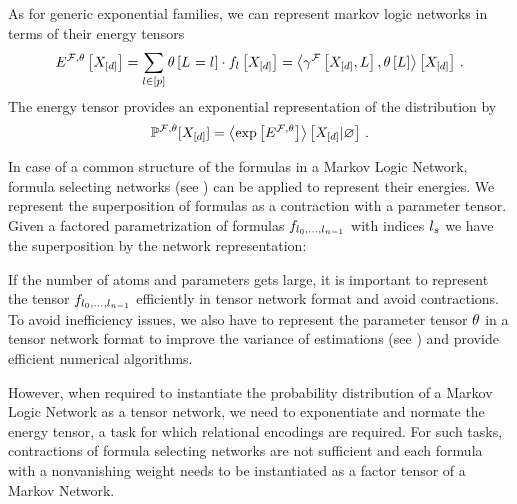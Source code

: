 As for generic exponential families, we can represent markov logic networks in terms of their energy tensors
\begin{align}
	E^{\mathcal{F},\theta}\left[X_{[d]}\right]
	= \sum_{l\in[p]} \theta\left[L_{}=l_{}\right] \cdot f_{l}\left[X_{[d]}\right] 
	= \left\langle \gamma^{\mathcal{F}}\left[X_{[d]},L\right],\theta\left[L\right]\right\rangle \left[ X_{[d]} \right] \, .
\end{align}
The energy tensor provides an exponential representation of the distribution by
\begin{align}
	\mathbb{P}^{\mathcal{F},\theta}[X_{[d]}] = \left\langle \mathrm{exp}\left[E^{\mathcal{F},\theta}\right]\right\rangle \left[ X_{[d]} | \varnothing \right] \, . 
\end{align}

In case of a common structure of the formulas in a Markov Logic Network, formula selecting networks (see ) can be applied to represent their energies.
We represent the superposition of formulas as a contraction with a parameter tensor.
Given a factored parametrization of formulas $f_{l_{0},\ldots,l_{n-1}}$ with indices $l_{s}$ we have the superposition by the network representation:
\begin{center}
	
\end{center}


If the number of atoms and parameters gets large, it is important to represent the tensor ${f_{l_{0},\ldots,l_{n-1}}}$ efficiently in tensor network format and avoid contractions.
To avoid inefficiency issues, we also have to represent the parameter tensor $\theta$ in a tensor network format to improve the variance of estimations (see ) and provide efficient numerical algorithms.

However, when required to instantiate the probability distribution of a Markov Logic Network as a tensor network, we need to exponentiate and normate the energy tensor, a task for which relational encodings are required.
For such tasks, contractions of formula selecting networks are not sufficient and each formula with a nonvanishing weight needs to be instantiated as a factor tensor of a Markov Network. 






